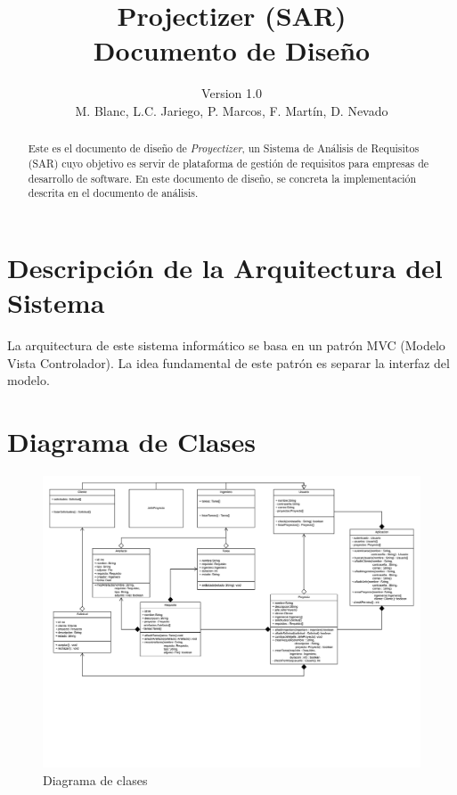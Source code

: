 \documentclass[a4paper, spanish]{article}
\title{Projectizer (SAR) \\ Documento de Diseño}
\author{Version 1.0 \\ M. Blanc, L.C. Jariego, P. Marcos, F. Martín, D. Nevado}
\begin{document}
\maketitle
\begin{abstract}
Este es el documento de diseño de \textit{Proyectizer}, un Sistema de Análisis de Requisitos (SAR) cuyo objetivo es servir de plataforma de gestión de requisitos para empresas de desarrollo de software.
En este documento de diseño, se concreta la implementación descrita en el documento de análisis.
\end{abstract}
\vspace{\fill}
\tableofcontents
\let\oldsection\section\renewcommand\section{\clearpage\oldsection}

\section{Descripción de la Arquitectura del Sistema}
La arquitectura de este sistema informático se basa en un patrón MVC (Modelo Vista Controlador). La idea fundamental de este patrón es separar la interfaz del modelo.
 

\section{Diagrama de Clases}
\begin{figure}[h!]
\centering
\includegraphics[width=\textwidth]{diagramas/diagrama-clases.png}
\caption{Diagrama de clases}
\end{figure}
\end{document}
